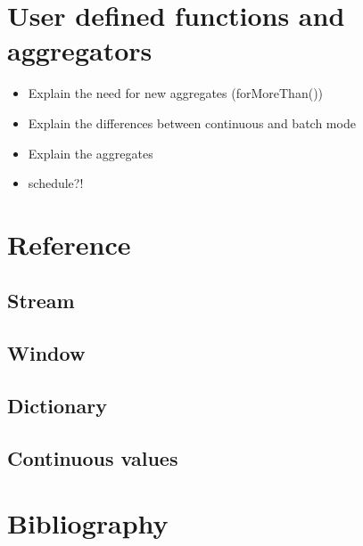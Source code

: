 \documentclass{report}
\begin{document}
\chapter{User defined functions and aggregators}
\begin{itemize}
\item Explain the need for new aggregates (forMoreThan())
\item Explain the differences between continuous and batch mode
\item Explain the aggregates
\item schedule?!
\end{itemize}
\chapter{Reference}

\section{Stream}

\section{Window}

\section{Dictionary}

\section{Continuous values}

\chapter{Bibliography}
\end{document}
